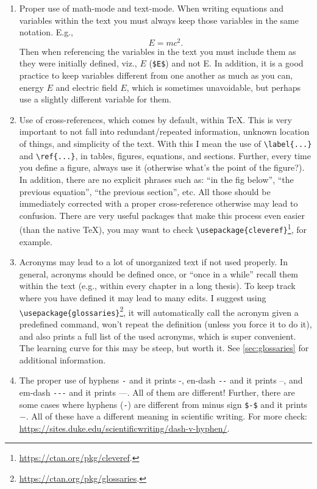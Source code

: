 \begin{enumerate}

  \item Proper use of math-mode and text-mode. When writing equations and variables within the text you must always keep those variables in the same notation. E.g.,
  \begin{equation}
      E = mc^2.
  \end{equation}
  Then when referencing the variables in the text you must include them as they were initially defined, viz., $E$ (\verb|$E$|) and not E. In addition, it is a good practice to keep variables different from one another as much as you can, energy $E$ and electric field $E$, which is sometimes unavoidable, but perhaps use a slightly different variable for them. 

  \item {Use of cross-references}, which comes by default, within \TeX. This is very important to not fall into redundant/repeated information, unknown location of things, and simplicity of the text. With this I mean the use of \verb|\label{...}| and \verb|\ref{...}|, in tables, figures, equations, and sections. Further, every time you define a figure, always use it (otherwise what's the point of the figure?). In addition, there are no explicit phrases such as: ``in the fig below'', ``the previous equation'', ``the previous section'', etc. All those should be immediately corrected with a proper cross-reference otherwise may lead to confusion. There are very useful packages that make this process even easier (than the native \TeX), you may want to check \verb|\usepackage{cleveref}|\footnote{\url{https://ctan.org/pkg/cleveref}.}, for example.
  
  \item Acronyms may lead to a lot of unorganized text if not used properly. In general, acronyms should be defined once, or ``once in a while'' recall them within the text (e.g., within every chapter in a long thesis). To keep track where you have defined it may lead to many edits. I suggest using \verb|\usepackage{glossaries}|\footnote{\url{https://ctan.org/pkg/glossaries}.}, it will automatically call the acronym given a predefined command, won't repeat the definition (unless you force it to do it), and also prints a full list of the used acronyms, which is super convenient. The learning curve for this may be steep, but worth it. See \cref{sec:glossaries} for additional information.
  
  \item The proper use of hyphens \verb|-| and it prints -, en-dash \verb|--| and it prints --, and em-dash \verb|---| and it prints ---. All of them are different! Further, there are some cases where hyphens (\verb|-|) are different from minus sign \verb|$-$| and it prints $-$. All of these have a different meaning in scientific writing. For more check: \url{https://sites.duke.edu/scientificwriting/dash-v-hyphen/}.
  

\end{enumerate}
